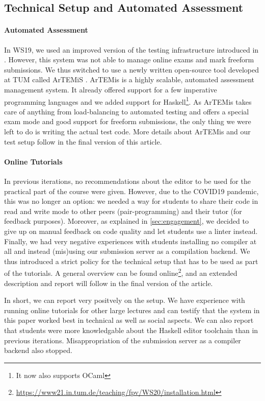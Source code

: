 \subsection{Technical Setup and Automated Assessment}\label{sec:tech_setup_test}

\paragraph{Automated Assessment}
In WS19, we used an improved version of
the testing infrastructure introduced in \citep{next_1100}.
However, this system was not able to manage online exams and mark freeform submissions.
We thus switched to use a newly written open-source
tool developed at TUM called ArTEMiS \citep{artemis}.
ArTEMis is a highly scalable, automated assessment management system.
It already offered support for a few imperative programming languages
and we added support for Haskell\footnote{It now also supports OCaml}.
As ArTEMis takes care of anything from load-balancing to
automated testing and
offers a special exam mode and good support for freeform submissions,
the only thing we were left to do is writing the actual test code.
More details about ArTEMis and our test setup follow
in the final version of this article.

\paragraph{Online Tutorials}
In previous iterations,
no recommendations about the editor to be used for the practical part of the course
were given.
However, due to the COVID19 pandemic,
this was no longer an option:
we needed a way for students to share their code in read and write mode
to other peers (pair-programming) and their tutor (for feedback purposes).
Moreover, as explained in \cref{sec:engagement},
we decided to give up on manual feedback on code quality
and let students use a linter instead.
Finally, we had very negative experiences with students
installing no compiler at all
and instead (mis)using our submission server as a compilation backend.
We thus introduced a strict policy
for the technical setup that has to be used as part of
the tutorials.
A general overview can be found online\footnote{\url{https://www21.in.tum.de/teaching/fpv/WS20/installation.html}},
and an extended description and report will follow in the final version of the article.

In short, we can report very positvely on the setup.
We have experience with running online tutorials for other large lectures and can testify that
the system in this paper worked best in technical as well as social aspects.
We can also report that students were more knowledgable
about the Haskell editor toolchain than in previous iterations.
Misappropriation of the submission server as a compiler backend also stopped.

